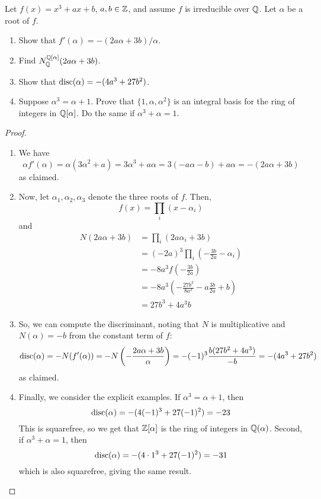 \begin{exe}{2.28} Let $f(x) = x^3+ax+b$, $a,b \in \mathbb{Z}$, and assume $f$ is irreducible over $\mathbb{Q}$. Let $\alpha$ be a root of $f$.
\begin{enumerate}
\item Show that $f'(\alpha) = -(2a\alpha + 3b)/\alpha$.
\item Find $N^{\mathbb{Q}[\alpha]}_{\mathbb{Q}}(2a\alpha+3b)$.
\item Show that $\operatorname{disc}(\alpha) = -(4a^3 + 27b^2)$.
\item Suppose $\alpha^3 = \alpha+1$. Prove that $\{1, \alpha, \alpha^2\}$ is an integral basis for the ring of integers in $\mathbb{Q}[\alpha]$. Do the same if $\alpha^3 + \alpha = 1$.
\end{enumerate} \end{exe}
\begin{proof} ${}$
\begin{enumerate}
\item We have
    \[ \alpha f'(\alpha) = \alpha(3\alpha^2+a) = 3\alpha^3+a\alpha = 3(-a\alpha-b)+a\alpha = -(2a\alpha+3b) \]
    as claimed.
\item Now, let $\alpha_1,\alpha_2,\alpha_3$ denote the three roots of $f$. Then,
    \[ f(x) = \prod_i (x-\alpha_i) \]
    and
    \begin{align*}
    N(2a\alpha+3b)
        &= \prod_i (2a\alpha_i+3b) \\
        &= (-2a)^3\prod_i \left(-\frac{3b}{2a}-\alpha_i\right) \\
        &= -8a^3f\left(-\frac{3b}{2a}\right) \\
        &= -8a^3\left(-\frac{27b^3}{8a^3}-a\frac{3b}{2a}+b\right) \\
        &= 27b^3+4a^3b
    \end{align*}
\item So, we can compute the discriminant, noting that $N$ is multiplicative and $N(\alpha) = -b$ from the constant term of $f$:
    \[ \operatorname{disc}(\alpha) = -N(f'(\alpha)) = -N\left(-\frac{2a\alpha+3b}{\alpha}\right) = -(-1)^3\frac{b(27b^2+4a^3)}{-b} = -(4a^3+27b^2) \]
    as claimed.
\item Finally, we consider the explicit examples. If $\alpha^3 = \alpha+1$, then
    \[ \operatorname{disc}(\alpha) = -(4(-1)^3+27(-1)^2) = -23 \]
    This is squarefree, so we get that $\mathbb{Z}[\alpha]$ is the ring of integers in $\mathbb{Q}(\alpha)$. Second, if $\alpha^3+\alpha = 1$, then
    \[ \operatorname{disc}(\alpha) = -(4 \cdot 1^3 + 27(-1)^2) = -31 \]
    which is also squarefree, giving the same result. \qedhere
\end{enumerate} \end{proof}